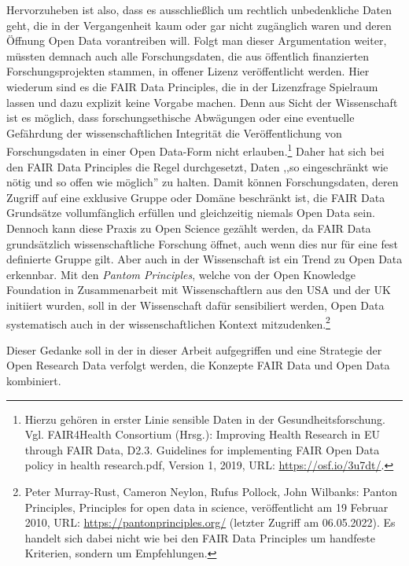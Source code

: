Hervorzuheben ist also, dass es ausschließlich um rechtlich unbedenkliche Daten geht, die in der Vergangenheit kaum oder gar nicht zugänglich waren und deren Öffnung Open Data vorantreiben will. Folgt man dieser Argumentation weiter, müssten demnach auch alle Forschungsdaten, die aus öffentlich finanzierten Forschungsprojekten stammen, in offener Lizenz veröffentlicht werden. Hier wiederum sind es die FAIR Data Principles, die in der Lizenzfrage Spielraum lassen und dazu explizit keine Vorgabe machen. Denn aus Sicht der Wissenschaft ist es möglich, dass forschungsethische Abwägungen oder eine eventuelle Gefährdung der wissenschaftlichen Integrität die Veröffentlichung von Forschungsdaten in einer Open Data-Form nicht erlauben.\footnote{Hierzu gehören in erster Linie sensible Daten in der Gesundheitsforschung. Vgl. FAIR4Health Consortium (Hrsg.): Improving Health Research in EU through FAIR Data, D2.3. Guidelines for implementing FAIR Open Data policy in health research.pdf, Version 1, 2019, URL: \url{https://osf.io/3u7dt/}.} Daher hat sich bei den FAIR Data Principles die Regel durchgesetzt, Daten ,,so eingeschränkt wie nötig und so offen wie möglich'' zu halten. Damit können Forschungsdaten, deren Zugriff auf eine exklusive Gruppe oder Domäne beschränkt ist, die FAIR Data Grundsätze vollumfänglich erfüllen und gleichzeitig niemals Open Data sein. Dennoch kann diese Praxis zu Open Science gezählt werden, da FAIR Data grundsätzlich wissenschaftliche Forschung öffnet, auch wenn dies nur für eine fest definierte Gruppe gilt. Aber auch in der Wissenschaft ist ein Trend zu Open Data erkennbar. Mit den \textit{Pantom Principles}, welche von der Open Knowledge Foundation in Zusammenarbeit mit Wissenschaftlern aus den USA und der UK initiiert wurden, soll in der Wissenschaft dafür sensibiliert werden, Open Data systematisch auch in der wissenschaftlichen Kontext mitzudenken.\footnote{Peter Murray-Rust, Cameron Neylon, Rufus Pollock, John Wilbanks: Panton Principles, Principles for open data in science, veröffentlicht am 19 Februar 2010, URL: \url{https://pantonprinciples.org/} (letzter Zugriff am 06.05.2022). Es handelt sich dabei nicht wie bei den FAIR Data Principles um handfeste Kriterien, sondern um Empfehlungen.} 

Dieser Gedanke soll in der in dieser Arbeit aufgegriffen und eine Strategie der Open Research Data verfolgt werden, die Konzepte FAIR Data und Open Data kombiniert.

